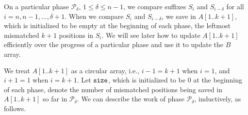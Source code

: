\documentclass[11pt]{llncs}
\begin{document}
On a particular phase $\mathcal{P}_\delta$, $1\leq \delta\leq n-1$, we
compare suffixes $S_i$ and $S_{i-\delta}$ for all
$i=n,n-1,\ldots,\delta+1$. When we compare $S_i$ and $S_{i-\delta}$,
we save in $A[1.. k+1]$, which is initialized to be empty at the
beginning of each phase, the leftmost mismatched $k+1$ positions in
$S_i$. We will see later how to update $A[1.. k+1]$ efficiently
over the progress of a particular phase and use it to update the $B$
array. 

We treat $A[1.. k+1]$ as a circular array,
i.e., $i-1 = k+1$ when $i=1$, and $i+1=1$ when $i=k+1$. Let ${\tt
  size}$, which is initialized to be $0$ at the beginning of each
phase, denote the number of mismatched positions being saved in
$A[1.. k+1]$ so far in $\mathcal{P}_\delta$. We can describe the
work of phase $\mathcal{P}_\delta$, inductively, as follows.
\end{document}
